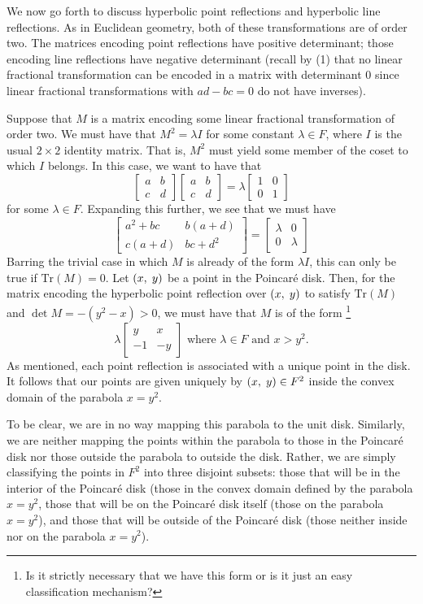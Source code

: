 \documentclass[12pt]{article}
\newcommand{\poincare}{Poincar\'{e} }
\newcommand{\Tr}{\text{Tr}}
\newcommand{\ttc}{, \hspace{1mm}}
\newcommand{\lftmat}[4]{\begin{bmatrix} {#1} & {#2} \\ {#3} & {#4} \end{bmatrix}}
\newcommand{\stanlftmat}{\lftmat{a}{b}{c}{d}}
\newcommand{\pointmat}[2]{\lftmat{{#2}}{{#1}}{-1}{-{#2}}}
\newcommand{\stanpointmat}{\pointmat{x}{y}}
\theoremstyle{plain}
\theoremstyle{definition}
\begin{document}
We now go forth to discuss hyperbolic point reflections and hyperbolic line reflections. As in Euclidean geometry, both of these transformations are of order two. The matrices encoding point reflections have positive determinant; those encoding line reflections have negative determinant (recall by (1) that no linear fractional transformation can be encoded in a matrix with determinant 0 since linear fractional transformations with $ad - bc = 0$ do not have inverses). 

Suppose that $M$ is a matrix encoding some linear fractional transformation of order two. We must have that $M^2 = \lambda I$ for some constant $\lambda \in F$, where $I$ is the usual $2 \times 2$ identity matrix. That is, $M^2$ must yield some member of the coset to which $I$ belongs. In this case, we want to have that 
	\[
		\stanlftmat \stanlftmat = \lambda \lftmat{1}{0}{0}{1}
	\]
for some $\lambda \in F$. Expanding this further, we see that we must have 
	\[
		\lftmat{a^2 + bc}{b(a+d)}{c(a+d)}{bc+d^2} =  \lftmat{\lambda}{0}{0}{\lambda}
	\]
Barring the trivial case in which $M$ is already of the form $\lambda I$, this can only be true if $\Tr(M) = 0$. Let $(x \ttc y)$ be a point in the \poincare disk. Then, for the matrix encoding the hyperbolic point reflection over $(x \ttc y)$ to satisfy $\Tr(M)$ and $\det M = -(y^2 - x) > 0$, we must have that $M$ is of the form \footnote{Is it strictly necessary that we have this form or is it just an easy classification mechanism?} 
\begin{equation} 
	\lambda \stanpointmat \text{ where } \lambda \in F \text{ and } x > y^2. 
\end{equation}	
As mentioned, each point reflection is associated with a unique point in the disk. It follows that our points are given uniquely by $(x \ttc y) \in F^2$ inside the convex domain of the parabola $x = y^2$.

To be clear, we are in no way mapping this parabola to the unit disk. Similarly, we are neither mapping the points within the parabola to those in the \poincare disk nor those outside the parabola to outside the disk. Rather, we are simply classifying the points in $F^2$ into three disjoint subsets: those that will be in the interior of the \poincare disk (those in the convex domain defined by the parabola $x = y^2$, those that will be on the \poincare disk itself (those on the parabola $x = y^2$), and those that will be outside of the \poincare disk (those neither inside nor on the parabola $x = y^2$). 
\end{document}
